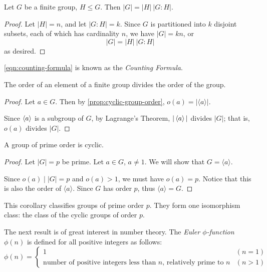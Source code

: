 \begin{theorem}
Let $G$ be a finite group, $H\le G$. Then $|G|=|H|\:|G:H|$.
\end{theorem}

\begin{proof}
Let $|H|=n$, and let $|G:H|=k$. Since $G$ is partitioned into $k$ disjoint subsets, each of which has cardinality $n$, we have $|G|=kn$, or
\begin{equation}\label{eqn:counting-formula}
|G|=|H|\:|G:H|
\end{equation}
as desired.
\end{proof}

\cref{eqn:counting-formula} is known as the \emph{Counting Formula}.

\begin{corollary}
The order of an element of a finite group divides the order of the group.
\end{corollary}

\begin{proof}
Let $a\in G$. Then by \cref{prop:cyclic-group-order}, $o(a)=|\langle a\rangle|$.

Since $\left\langle a\right\rangle$ is a subgroup of $G$, by Lagrange's Theorem, $|\left\langle a\right\rangle|$ divides $|G|$; that is, $o(a)$ divides $|G|$.
\end{proof}

\begin{corollary}
A group of prime order is cyclic.
\end{corollary}

\begin{proof}
Let $|G|=p$ be prime. Let $a\in G$, $a\neq1$. We will show that $G=\langle a\rangle$.

Since $o(a)\mid |G|=p$ and $o(a)>1$, we must have $o(a)=p$. Notice that this is also the order of $\langle a\rangle$. Since $G$ has order $p$, thus $\langle a\rangle=G$.
\end{proof}

This corollary classifies groups of prime order $p$. They form one isomorphism class: the class of the cyclic groups of order $p$.

The next result is of great interest in number theory. The \emph{Euler $\phi$-function} $\phi(n)$ is defined for all positive integers as follows:
\[\phi(n)=\begin{cases}
1&(n=1)\\
\text{number of positive integers less than $n$, relatively prime to $n$}&(n>1)
\end{cases}\]

